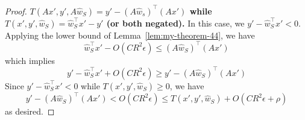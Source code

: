 \documentclass[english]{article}
\theoremstyle{plain}
\begin{document}
\begin{proof}
\textbf{$T(Ax',y',A\widehat{w}_{S})=y'-\left(A\widehat{w}_{s}\right)^{\top}\left(Ax'\right)$
while $T(x',y',\widehat{w}_{S})=\widehat{w}_{S}^{\top}x'-y'$ (or
both negated).} In this case, we $y'-\widehat{w}_{S}^{\top}x'<0$.
Applying the lower bound of Lemma~\ref{lem:my-theorem-44},
we have
\[
\widehat{w}_{S}^{\top}x'-O(CR^{2}\epsilon)\leq\left(A\widehat{w}_{S}\right)^{\top}\left(Ax'\right)
\]
which implies
\[
y'-\widehat{w}_{S}^{\top}x'+O(CR^{2}\epsilon)\geq y'-\left(A\widehat{w}_{S}\right)^{\top}\left(Ax'\right)
\]
Since $y'-\widehat{w}_{S}^{\top}x'<0$ while $T(x',y',\widehat{w}_{S})\geq0$,
we have
\[
y'-\left(A\widehat{w}_{S}\right)^{\top}\left(Ax'\right)<O(CR^{2}\epsilon)\leq T(x',y',\widehat{w}_{S})+O(CR^{2}\epsilon+\rho)
\]
as desired.
\end{proof}

\end{document}
